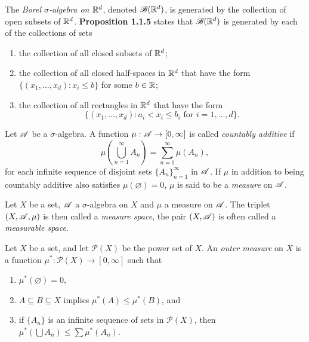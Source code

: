 \documentclass[12pt]{article}
\begin{document}
\begin{definition}
    The \textit{Borel $\sigma$-algebra on $\mathbb{R}^d$}, denoted $\mathscr{B}(\mathbb{R}^d)$, is generated by the collection of open subsets of $\mathbb{R}^d$. \textbf{Proposition 1.1.5} states that $\mathscr{B}(\mathbb{R}^d)$ is generated by each of the collections of sets 
    \begin{enumerate}[label=(\alph*)]
        \item the collection of all closed subsets of $\mathbb{R}^d$;
        \item the collection of all closed half-spaces in $\mathbb{R}^d$ that have the form $\{(x_1,\dots,x_d):x_i\leq b\}$ for some $b\in\mathbb{R}$;
        \item the collection of all rectangles in $\mathbb{R}^d$ that have the form 
        \begin{equation*}
            \big\{(x_1,\dots,x_d):a_i<x_i\leq b_i\text{ for }i=1,\dots,d\big\}.
        \end{equation*}
    \end{enumerate}
\end{definition}
\begin{definition}[Measure]
    Let $\mathscr{A}$ be a $\sigma$-algebra. A function $\mu:\mathscr{A}\to[0,\infty]$ is called \textit{countably additive} if
    \begin{equation*}
        \mu\left(\bigcup_{n=1}^\infty A_n\right)=\sum_{n=1}^\infty \mu(A_n),
    \end{equation*}
    for each infinite sequence of disjoint sets $\{A_n\}_{n=1}^\infty$ in $\mathscr{A}$. If $\mu$ in addition to being countably additive also satisfies $\mu(\varnothing)=0$, $\mu$ is said to be a \textit{measure} on $\mathscr{A}$. 
\end{definition}
\begin{definition}
    Let $X$ be a set, $\mathscr{A}$ a $\sigma$-algebra on $X$ and $\mu$ a measure on $\mathscr{A}$. The triplet $(X,\mathscr{A},\mu)$ is then called a \textit{measure space}, the pair $(X,\mathscr{A})$ is often called a \textit{measurable space}.
\end{definition}
\begin{definition}
    Let $X$ be a set, and let $\mathscr{P}(X)$ be the power set of $X$. An \textit{outer measure} on $X$ is a function $\mu^*:\mathscr{P}(X)\to [0,\infty]$ such that 
    \begin{enumerate}[label=(\alph*)]
        \item $\mu^*(\varnothing)=0$,
        \item $A\subseteq B\subseteq X$ implies $\mu^*(A)\leq \mu^*(B)$, and
        \item if $\{ A_n\}$ is an infinite sequence of sets in $\mathscr{P}(X)$, then $\mu^*\left(\bigcup A_n\right) \leq \sum \mu^*(A_n)$.
    \end{enumerate}
\end{definition}
\end{document}
